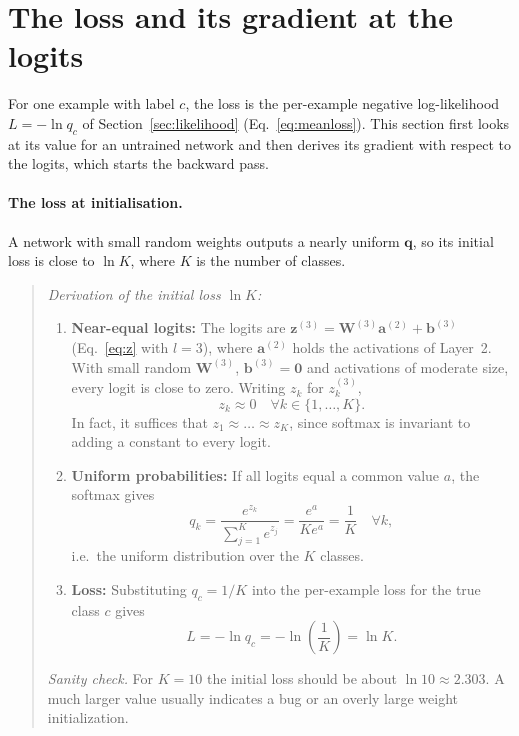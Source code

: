 \documentclass[12pt]{article}
\numberwithin{equation}{section} %
\newcommand{\vc}[1]{\symbf{#1}}
\begin{document}
\section{The loss and its gradient at the logits}
\label{sec:loss}

For one example with label $c$, the loss is the per-example negative
log-likelihood $L=-\ln q_c$ of Section~\ref{sec:likelihood}
(Eq.~\eqref{eq:meanloss}). This section first looks at its value for an
untrained network and then derives its gradient with respect to the logits,
which starts the backward pass.

\paragraph{The loss at initialisation.}
A network with small random weights outputs a nearly uniform $\vc{q}$, so its
initial loss is close to $\ln K$, where $K$ is the number of classes.

\begin{quote}
\textit{Derivation of the initial loss $\ln K$:}
\begin{enumerate}
    \item \textbf{Near-equal logits:}
        The logits are
        $\vc{z}^{(3)}=\vc{W}^{(3)}\vc{a}^{(2)}+\vc{b}^{(3)}$
        (Eq.~\eqref{eq:z} with $l=3$), where $\vc{a}^{(2)}$
        holds the activations of Layer~2. With small random
        $\vc{W}^{(3)}$, $\vc{b}^{(3)}=\vc{0}$ and activations
        of moderate size, every logit is close to zero.
        Writing $z_k$ for $z^{(3)}_k$,
        \[
            z_k \approx 0 \quad \forall k \in \{1, \dots, K\}.
        \]
        In fact, it suffices that $z_1 \approx \dots
        \approx z_K$, since softmax is
        invariant to adding a constant to every logit.

  \item \textbf{Uniform probabilities:} If all logits
        equal a common value $a$,
        the softmax gives
        \[
            q_k = \frac{e^{z_k}}{\sum_{j=1}^{K} e^{z_j}}
                = \frac{e^{a}}{K e^{a}} = \frac{1}{K}
            \quad \forall k,
        \]
        i.e.\ the uniform distribution over the $K$ classes.

    \item \textbf{Loss:} Substituting $q_c = 1/K$ into the per-example loss for the
    true class $c$ gives
    \[
        L = -\ln q_c = -\ln\!\left(\frac{1}{K}\right) = \ln K .
    \]
\end{enumerate}

\textit{Sanity check.} For $K = 10$ the initial loss
should be about $\ln 10 \approx 2.303$. A much larger
value usually indicates a bug or an overly large
weight initialization.
\end{quote}
\end{document}

